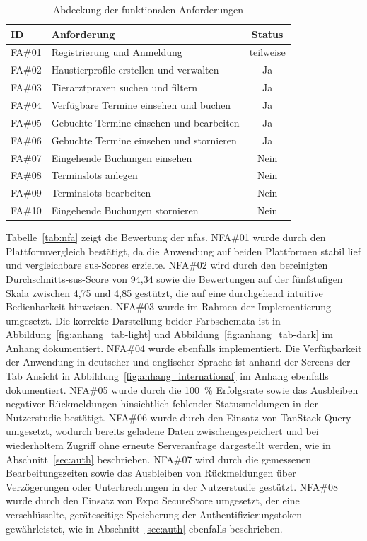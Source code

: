 \begin{table}[H]
\centering
\begin{tabular}{|l|p{7cm}|c|}
\hline
\textbf{ID} & \textbf{Anforderung} & \textbf{Status} \\
\hline
FA\#01 & Registrierung und Anmeldung & teilweise \\
FA\#02 & Haustierprofile erstellen und verwalten & Ja \\
FA\#03 & Tierarztpraxen suchen und filtern & Ja \\
FA\#04 & Verfügbare Termine einsehen und buchen & Ja \\
FA\#05 & Gebuchte Termine einsehen und bearbeiten & Ja \\
FA\#06 & Gebuchte Termine einsehen und stornieren & Ja \\
FA\#07 & Eingehende Buchungen einsehen & Nein \\
FA\#08 & Terminslots anlegen & Nein \\
FA\#09 & Terminslots bearbeiten & Nein \\
FA\#10 & Eingehende Buchungen stornieren & Nein \\
\hline
\end{tabular}
\caption{Abdeckung der funktionalen Anforderungen}
\label{tab:fa}
\end{table}

Tabelle~\ref{tab:nfa} zeigt die Bewertung der \gls{nfas}. NFA\#01 wurde durch den Plattformvergleich bestätigt, da die Anwendung auf beiden Plattformen stabil lief und vergleichbare \gls{sus}-Scores erzielte. NFA\#02 wird durch den bereinigten Durchschnitts-\gls{sus}-Score von 94,34 sowie die Bewertungen auf der fünfstufigen Skala zwischen 4,75 und 4,85 gestützt, die auf eine durchgehend intuitive Bedienbarkeit hinweisen. NFA\#03 wurde im Rahmen der Implementierung umgesetzt. Die korrekte Darstellung beider Farbschemata ist in Abbildung~\ref{fig:anhang_tab-light} und
Abbildung~\ref{fig:anhang_tab-dark} im Anhang dokumentiert. NFA\#04 wurde ebenfalls implementiert. Die Verfügbarkeit der Anwendung in deutscher und englischer Sprache ist anhand der Screens der Tab Ansicht in Abbildung~\ref{fig:anhang_international} im Anhang ebenfalls dokumentiert. NFA\#05 wurde durch die 100~\% Erfolgsrate sowie das Ausbleiben negativer Rückmeldungen hinsichtlich fehlender Statusmeldungen in der Nutzerstudie bestätigt. NFA\#06 wurde durch den Einsatz von TanStack
Query umgesetzt, wodurch bereits geladene Daten zwischengespeichert und bei wiederholtem Zugriff ohne erneute Serveranfrage dargestellt werden, wie in Abschnitt~\ref{sec:auth} beschrieben. NFA\#07 wird durch die gemessenen Bearbeitungszeiten sowie das Ausbleiben von Rückmeldungen über Verzögerungen oder Unterbrechungen in der Nutzerstudie gestützt. NFA\#08 wurde durch den Einsatz von Expo SecureStore umgesetzt, der eine verschlüsselte, geräteseitige Speicherung der
Authentifizierungstoken gewährleistet, wie in Abschnitt~\ref{sec:auth} ebenfalls beschrieben.

